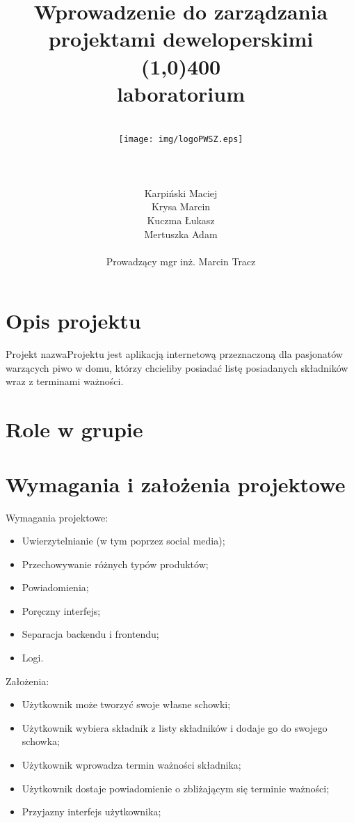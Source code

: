 \documentclass[12pt,a4paper]{article}
\author{
	\\\texttt{[image: img/logoPWSZ.eps]} \\\\\\\\
	\hfill Karpiński Maciej\\
	\hfill Krysa Marcin\\
	\hfill Kuczma Łukasz\\
	\hfill Mertuszka Adam\\\\
	\hfill Prowadzący mgr inż. Marcin Tracz
	}
\title{\textbf{Wprowadzenie do zarządzania projektami deweloperskimi}\\\line(1,0){400}\\\textbf{laboratorium}}
\date{}
\begin{document}
	\maketitle
	\thispagestyle{fancy}
	\fancyhf{}
	\rhead{\textcolor{gray}{\footnotesize Państwowa Wyższa Szkoła Zawodowa im. Witelona w Legnicy\\Informatyka, rok III\\Semestr zimowy 2020/2021}}	
	\renewcommand{\headrulewidth}{0pt}
	\clearpage

	\pagestyle{fancy}
	\rfoot{\thepage}	
	\tableofcontents
	\newpage

	\section{Opis projektu}
		\indent Projekt nazwaProjektu jest aplikacją internetową przeznaczoną dla pasjonatów warzących piwo w domu, którzy chcieliby posiadać listę posiadanych składników
		wraz z terminami ważności.    
	\newpage
	
	\section{Role w grupie}
	\newpage
	
	\section{Wymagania i założenia projektowe}
		Wymagania projektowe:
		\begin{itemize}
			\item Uwierzytelnianie (w tym poprzez social media);
			\item Przechowywanie różnych typów produktów;
			\item Powiadomienia;
			\item Poręczny interfejs;
			\item Separacja backendu i frontendu;
			\item Logi.
		\end{itemize}
		Założenia:
		\begin{itemize}
			\item Użytkownik może tworzyć swoje własne schowki;
			\item Użytkownik wybiera składnik z listy składników i dodaje go do swojego schowka;
			\item Użytkownik wprowadza termin ważności składnika;
			\item Użytkownik dostaje powiadomienie o zbliżającym się terminie ważności;
			\item Przyjazny interfejs użytkownika;
		\end{itemize}				 
	\newpage
	
\end{document}
